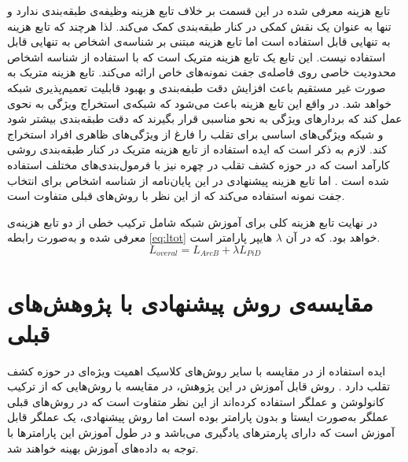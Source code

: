  تابع هزینه معرفی شده در این قسمت بر خلاف تابع هزینه
 وظیفه‌ی طبقه‌بندی ندارد و تنها به عنوان یک نقش کمکی در کنار طبقه‌بندی کمک می‌کند. لذا هرچند که تابع هزینه 
  به تنهایی قابل استفاده است اما تابع هزینه مبتنی بر شناسه‌ی اشخاص به تنهایی قابل استفاده نیست. این تابع یک تابع هزینه متریک است که با استفاده از شناسه اشخاص محدودیت خاصی روی فاصله‌ی جفت نمونه‌های خاص ارائه می‌کند. تابع هزینه متریک به صورت غیر مستقیم باعث افزایش دقت طبفه‌بندی و بهبود قابلیت تعمیم‌پذیری شبکه خواهد شد. در واقع این تابع هزینه باعث می‌شود که شبکه‌ی استخراج ویژگی به نحوی عمل کند که بردار‌های ویژگی به نحو مناسبی قرار بگیرند که دقت طبقه‌بندی بیشتر شود و شبکه ویژگی‌های اساسی برای تقلب را فارغ از ویژگی‌های ظاهری افراد استخراج کند. لازم به ذکر است که ایده استفاده از تابع هزینه متریک در کنار طبقه‌بندی روشی کارآمد است که در حوزه کشف تقلب در چهره نیز با فرمول‌بندی‌های مختلف استفاده شده است
\cite{shao2019multi,jia2020single,feng2020learning,perez2019deep,tu2020learning,xu2021improving}.
اما تابع هزینه پیشنهادی در این پایان‌نامه از شناسه اشخاص برای انتخاب جفت نمونه استفاده می‌کند که از این نظر با روش‌های قبلی متفاوت است.
  
  در نهایت تابع هزینه کلی برای آموزش شبکه شامل ترکیب خطی از دو تابع هزینه‌ی معرفی شده و به‌صورت رابطه
\ref{eq:ltot}
 خواهد بود. که در آن 
 $\lambda$
   هایپر پارامتر است.
\begin{equation}\label{eq:ltot}
	L_{overal} = L_{ArcB} + \lambda L_{PiD}
\end{equation}

\section{مقایسه‌ی روش پیشنهادی با پژوهش‌های قبلی}
ایده استفاده از 
در مقایسه با سایر روش‌های کلاسیک اهمیت ویژه‌ای در حوزه کشف تقلب دارد
\cite{maatta2011face,chingovska2012effectiveness,freitas2012lbp,rehman2020enhancing,li2019face,yu2020searching,zhang2020face}.
روش  قابل آموزش در این پژوهش، در مقایسه با روش‌هایی که از ترکیب کانولوشن و عملگر  استفاده کرده‌اند
\cite{li2019face,rehman2020enhancing}
از این نظر متفاوت است که در روش‌های قبلی عملگر  به‌صورت ایستا و بدون پارامتر بوده است اما روش پیشنهادی، یک عملگر قابل آموزش است که دارای پارمترهای یادگیری می‌باشد و در طول آموزش این پارامترها با توجه به داده‌های آموزش بهینه خواهند شد.

